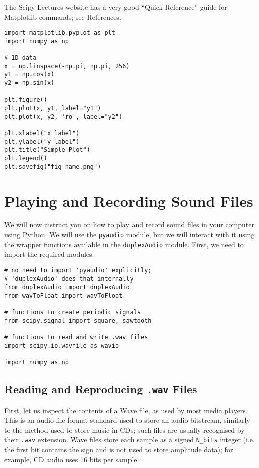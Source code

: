 The Scipy Lectures website has a very good ``Quick Reference'' guide for Matplotlib commands; see References.

\begin{lstlisting}[frame=single]
import matplotlib.pyplot as plt
import numpy as np

# 1D data
x = np.linspace(-np.pi, np.pi, 256)
y1 = np.cos(x)
y2 = np.sin(x)

plt.figure()
plt.plot(x, y1, label="y1")
plt.plot(x, y2, 'ro', label="y2")

plt.xlabel("x label")
plt.ylabel("y label")
plt.title("Simple Plot")
plt.legend()
plt.savefig("fig_name.png")

\end{lstlisting}


\section{Playing and Recording Sound Files}

We will now instruct you on how to play and record sound files in your computer using Python. We will use the {\tt pyaudio} module, but we will interact with it using the wrapper functions available in the {\tt duplexAudio} module. First, we need to import the required modules:

\begin{lstlisting}[frame=single]
# no need to import 'pyaudio' explicitly;
# 'duplexAudio' does that internally
from duplexAudio import duplexAudio
from wavToFloat import wavToFloat

# functions to create periodic signals
from scipy.signal import square, sawtooth

# functions to read and write .wav files
import scipy.io.wavfile as wavio

import numpy as np
\end{lstlisting}

\subsection{Reading and Reproducing {\tt .wav} Files}

First, let us inspect the contents of a Wave file, as used by most media players. This is an audio file format standard used to store an audio bitstream, similarly to the method used to store music in CDs; such files are usually recognised by their {\tt .wav} extension. Wave files store each sample as a signed {\tt N\_bits} integer (i.e. the first bit contains the sign and is not used to store amplitude data); for example, CD audio uses 16 bits per sample.

